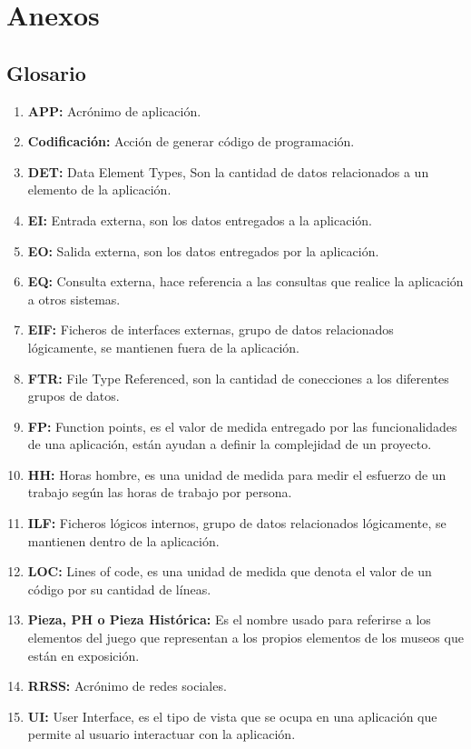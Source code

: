 \section{Anexos}
\subsection{Glosario}

\begin{enumerate}
	\item \textbf{APP:} Acrónimo de aplicación.
	\item \textbf{Codificación:} Acción de generar código de programación.
	\item \textbf{DET:} Data Element Types, Son la cantidad de datos relacionados a un elemento de la aplicación.
	\item \textbf{EI:} Entrada externa, son los datos entregados a la aplicación.
	\item \textbf{EO:} Salida externa, son los datos entregados por la aplicación.
	\item \textbf{EQ:} Consulta externa, hace referencia a las consultas que realice la aplicación a otros sistemas.
	\item \textbf{EIF:} Ficheros de interfaces externas, grupo de datos relacionados lógicamente, se mantienen fuera de la aplicación.
	\item \textbf{FTR:} File Type Referenced, son la cantidad de conecciones a los diferentes grupos de datos.
	\item \textbf{FP:} Function points, es el valor de medida entregado por las funcionalidades de una aplicación, están ayudan a definir la complejidad de un proyecto.
	\item \textbf{HH:} Horas hombre, es una unidad de medida para medir el esfuerzo de un trabajo según las horas de trabajo por persona.
	\item \textbf{ILF:} Ficheros lógicos internos, grupo de datos relacionados lógicamente, se mantienen dentro de la aplicación.
	\item \textbf{LOC:} Lines of code, es una unidad de medida que denota el valor de un código por su cantidad de líneas.
	\item \textbf{Pieza, PH  o Pieza Histórica:} Es el nombre usado para referirse a los elementos del juego que representan a los propios elementos de los museos que están en exposición.
	\item \textbf{RRSS:} Acrónimo de redes sociales.
	\item \textbf{UI:} User Interface, es el tipo de vista que se ocupa en una aplicación que permite al usuario interactuar con la aplicación.
\end{enumerate}















